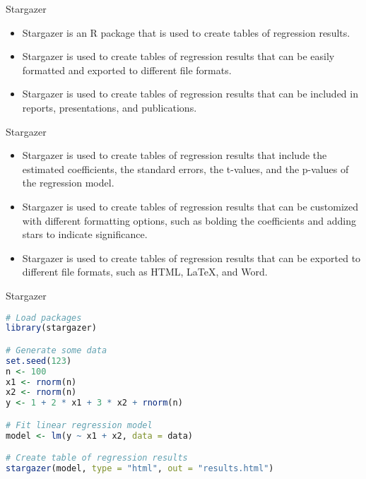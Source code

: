 \documentclass[serif, 9pt, aspectratio=32]{beamer}
\begin{document}
\begin{frame}{Stargazer}
    \begin{itemize}
        \setlength{\itemsep}{2em}
        \item Stargazer is an R package that is used to create tables of regression results.
        \item Stargazer is used to create tables of regression results that can be easily formatted and exported to different file formats.
        \item Stargazer is used to create tables of regression results that can be included in reports, presentations, and publications.
    \end{itemize}
\end{frame}

\begin{frame}{Stargazer}
    \begin{itemize}
        \setlength{\itemsep}{2em}
        \item Stargazer is used to create tables of regression results that include the estimated coefficients, the standard errors, the t-values, and the p-values of the regression model.
        \item Stargazer is used to create tables of regression results that can be customized with different formatting options, such as bolding the coefficients and adding stars to indicate significance.
        \item Stargazer is used to create tables of regression results that can be exported to different file formats, such as HTML, LaTeX, and Word.
    \end{itemize}
\end{frame}

\begin{frame}[fragile]{Stargazer}
    \begin{lstlisting}[language=R]
# Load packages
library(stargazer)

# Generate some data
set.seed(123)
n <- 100
x1 <- rnorm(n)
x2 <- rnorm(n)
y <- 1 + 2 * x1 + 3 * x2 + rnorm(n)

# Fit linear regression model
model <- lm(y ~ x1 + x2, data = data)

# Create table of regression results
stargazer(model, type = "html", out = "results.html")
    \end{lstlisting}
\end{frame}
\end{document}

